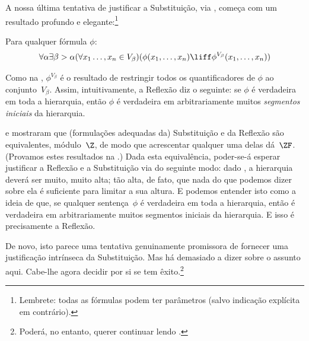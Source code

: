 \documentclass[../../../include/open-logic-section]{subfiles}
\begin{document}

A nossa última tentativa de justificar a Substituição, via \stagesinex, começa com um resultado profundo e elegante:\footnote{Lembrete: todas as fórmulas podem ter parâmetros (salvo indicação explícita em contrário).}
\begin{thm}
Para qualquer fórmula $\phi$:
\[
\forall \alpha \exists \beta > \alpha (\forall x_1 \ldots, x_n \in
V_\beta)(\phi(x_1, \ldots, x_n) \liff \phi^{V_\beta}(x_1, \ldots, x_n))
\]
\end{thm}
\noindent 
Como na , $\phi^{V_\beta}$ é o resultado de restringir todos os
quantificadores de $\phi$ ao conjunto~$V_\beta$. Assim, intuitivamente, a Reflexão
diz o seguinte: se $\phi$ é verdadeira em toda a hierarquia, então $\phi$ é
verdadeira em arbitrariamente muitos \emph{segmentos iniciais} da hierarquia. 

\citet{Montague1961} e \citet{Levy1960} mostraram que (formulações
adequadas da) Substituição e da Reflexão são equivalentes,
módulo~$\Z$, de modo que acrescentar qualquer uma delas dá~$\ZF$. (Provamos estes resultados na .) Dada esta
equivalência, poder-se-á esperar justificar a Reflexão e a Substituição via
\stagesinex{} do seguinte modo: dado \stagesinex, a hierarquia deverá ser
muito, muito alta; tão alta, de fato, que nada do que podemos dizer sobre ela é
suficiente para limitar a sua altura. E podemos entender isto como a
ideia de que, se qualquer sentença~$\phi$ é verdadeira em toda a hierarquia,
então é verdadeira em arbitrariamente muitos segmentos iniciais da hierarquia.
E isso é precisamente a Reflexão. 

De novo, isto parece uma tentativa genuinamente promissora de fornecer uma
justificação intrínseca da Substituição. Mas há demasiado a dizer sobre o assunto aqui. Cabe-lhe agora decidir por si se
tem êxito.\footnote{Poderá, no entanto, querer continuar lendo \citet[95--100]{Incurvati2020}.}
\end{document}
